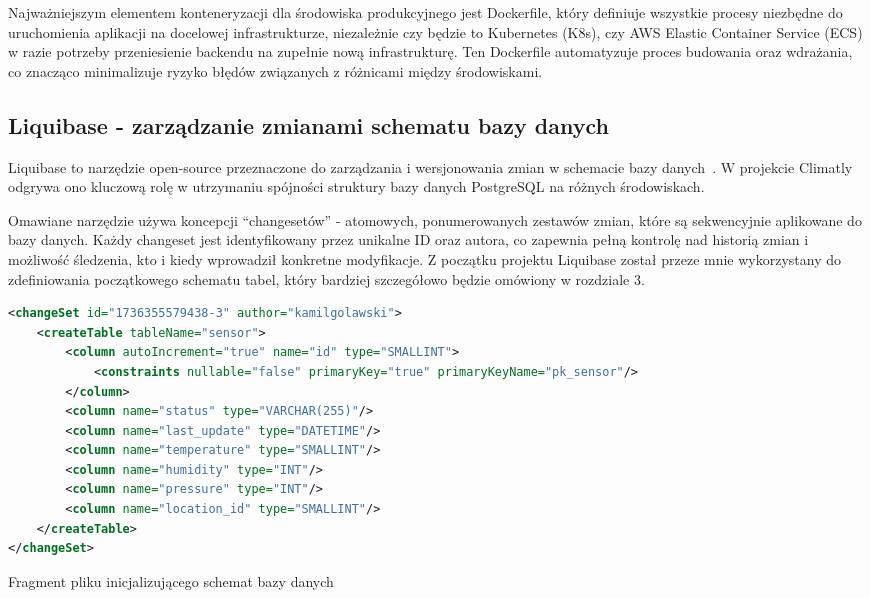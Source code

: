 \documentclass[a4paper,12pt,openany]{book}
\begin{document}
Najważniejszym elementem konteneryzacji dla środowiska produkcyjnego jest Dockerfile, który definiuje wszystkie procesy niezbędne do uruchomienia aplikacji na docelowej infrastrukturze, niezależnie czy będzie to Kubernetes (K8s), czy AWS Elastic Container Service (ECS) w razie potrzeby przeniesienie backendu na zupełnie nową infrastrukturę. Ten Dockerfile automatyzuje proces budowania oraz wdrażania, co znacząco minimalizuje ryzyko błędów związanych z różnicami między środowiskami.


\clearpage

\subsection*{Liquibase - zarządzanie zmianami schematu bazy danych}

Liquibase to narzędzie open-source przeznaczone do zarządzania i wersjonowania zmian w schemacie bazy danych~\cite{bib:liquibase2023}. W projekcie Climatly odgrywa ono kluczową rolę w utrzymaniu spójności struktury bazy danych PostgreSQL na różnych środowiskach.

Omawiane narzędzie używa koncepcji ``changesetów'' - atomowych, ponumerowanych zestawów zmian, które są sekwencyjnie aplikowane do bazy danych. Każdy changeset jest identyfikowany przez unikalne ID oraz autora, co zapewnia pełną kontrolę nad historią zmian i możliwość śledzenia, kto i kiedy wprowadził konkretne modyfikacje. Z początku projektu Liquibase został przeze mnie wykorzystany do zdefiniowania początkowego schematu tabel, który bardziej szczegółowo będzie omówiony w rozdziale 3.

\begin{lstfloat}[htbp]
\begin{lstlisting}[language=xml]
<changeSet id="1736355579438-3" author="kamilgolawski">
    <createTable tableName="sensor">
        <column autoIncrement="true" name="id" type="SMALLINT">
            <constraints nullable="false" primaryKey="true" primaryKeyName="pk_sensor"/>
        </column>
        <column name="status" type="VARCHAR(255)"/>
        <column name="last_update" type="DATETIME"/>
        <column name="temperature" type="SMALLINT"/>
        <column name="humidity" type="INT"/>
        <column name="pressure" type="INT"/>
        <column name="location_id" type="SMALLINT"/>
    </createTable>
</changeSet>
\end{lstlisting}
\caption{Fragment pliku inicjalizującego schemat bazy danych}
\label{lst:liquibase-init}
\end{lstfloat}
\end{document}
